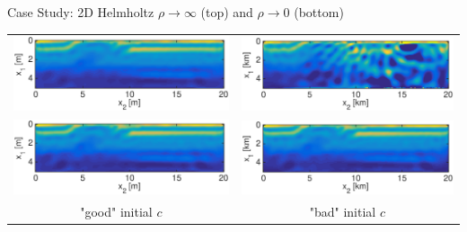 \documentclass{beamer}
\begin{document}
\begin{frame}{Case Study: 2D Helmholtz}
\centering
$\rho\rightarrow \infty$ (top) and $\rho\rightarrow 0$ (bottom)
\begin{tabular}{cc}
\includegraphics[scale=0.3]{./figs/2D_overthrust1_g.eps}&
\includegraphics[scale=0.3]{./figs/2D_overthrust2_g.eps}\\
\includegraphics[scale=0.3]{./figs/2D_overthrust1_h.eps}&
\includegraphics[scale=0.3]{./figs/2D_overthrust2_h.eps}\\
"good" initial $c$ & "bad" initial $c$
\end{tabular}
\end{frame}
\end{document}
